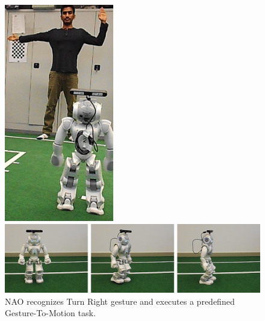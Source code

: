 \begin{figure}
	[h] 
	\begin{minipage}
		{1 
		\textwidth} \centering 
		\includegraphics[height=95mm]{figures/result/usr-turn-right.jpg} \caption*{} 
	\end{minipage}
	\begin{minipage}
		{1 
		\textwidth} \hspace{-5 mm} 
		\includegraphics[width=160mm]{figures/result/nao-gm-turn-right.jpg} 
	\end{minipage}
	\caption{NAO recognizes Turn Right gesture and executes a predefined Gesture-To-Motion task.} \label{res:gm:turn:right} 
\end{figure}
